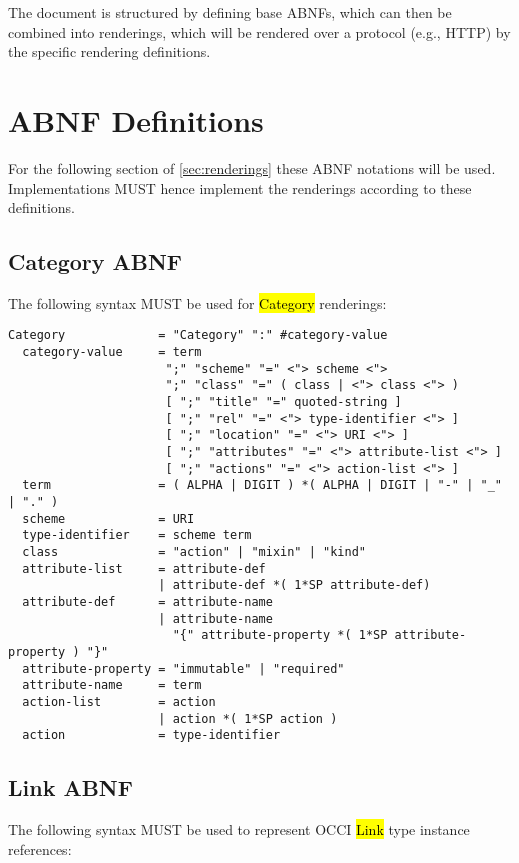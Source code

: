 \documentclass[10pt,a4paper]{article}
\begin{document}
The document is structured by defining base ABNFs, which can then be combined into renderings, which will
be rendered over a protocol (e.g., HTTP) by the specific rendering definitions.

\section{ABNF Definitions}

For the following section of \ref{sec:renderings} these ABNF notations will be used.
Implementations MUST hence implement the renderings according to these definitions.

\subsection{Category ABNF}

The following syntax MUST be used for \hl{Category} renderings:

\begin{verbatim}
Category             = "Category" ":" #category-value
  category-value     = term
                      ";" "scheme" "=" <"> scheme <">
                      ";" "class" "=" ( class | <"> class <"> )
                      [ ";" "title" "=" quoted-string ]
                      [ ";" "rel" "=" <"> type-identifier <"> ]
                      [ ";" "location" "=" <"> URI <"> ]
                      [ ";" "attributes" "=" <"> attribute-list <"> ]
                      [ ";" "actions" "=" <"> action-list <"> ]
  term               = ( ALPHA | DIGIT ) *( ALPHA | DIGIT | "-" | "_" | "." )
  scheme             = URI
  type-identifier    = scheme term
  class              = "action" | "mixin" | "kind"
  attribute-list     = attribute-def
                     | attribute-def *( 1*SP attribute-def)
  attribute-def      = attribute-name
                     | attribute-name
                       "{" attribute-property *( 1*SP attribute-property ) "}"
  attribute-property = "immutable" | "required"
  attribute-name     = term
  action-list        = action
                     | action *( 1*SP action )
  action             = type-identifier
\end{verbatim}

\subsection{Link ABNF}

The following syntax MUST be used to represent OCCI \hl{Link} type
instance references:
\end{document}
